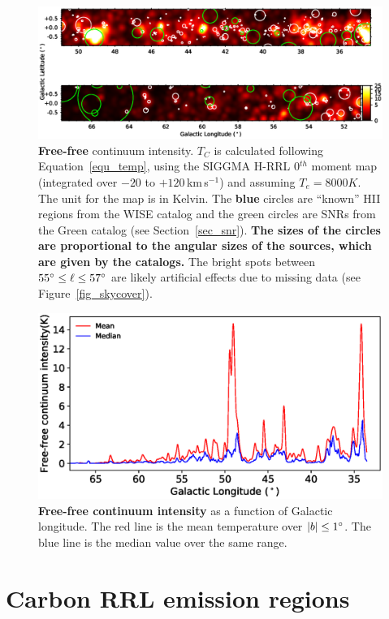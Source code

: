 \documentclass[manuscript]{aastex61}
\newcommand{\kms}{\,km\,s$^{-1}$}
\begin{document}
\begin{figure}[htbp]
\centering
\includegraphics[width = 7in]{temperature_thermal_map.eps}
\caption{\textbf{Free-free} continuum intensity.
$T_{C}$ is calculated following Equation~\ref{equ_temp}, using the SIGGMA H-RRL 0$^{th}$ moment map (integrated over $-20$ to $+120$\kms) and assuming $T_e = 8000 K$.
The unit for the map is in Kelvin.
The \textbf{blue} circles are ``known'' HII regions from the WISE catalog and the green circles are SNRs from the Green catalog (see Section~\ref{sec_snr}).
\textbf{The sizes of the circles are proportional to the angular sizes of the sources, which are given by the catalogs.}
The bright spots between $55\mbox{$^\circ$} \leq \ell \leq 57\mbox{$^\circ$}$ are likely artificial effects due to missing data (see Figure~\ref{fig_skycover}).}
\label{fig_gal_free}
\end{figure}
\begin{figure}[bhpt]
\centering
\includegraphics[width = 6in]{temperature_thermal_plot.eps}
\caption{\textbf{Free-free continuum intensity} as a function of Galactic longitude. The red line is the mean temperature over $|b|\leq 1\mbox{$^\circ$}$. The blue line is the median value over the same range.}
\label{fig_gal_plot}
\end{figure}

\section{Carbon RRL emission regions} \label{sec_crrl}
\end{document}
